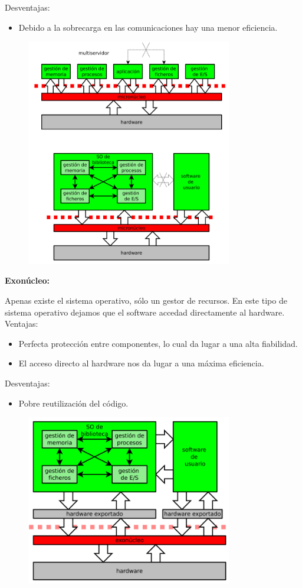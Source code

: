 \documentclass{article}
\begin{document}
Desventajas:
\begin{itemize}
\item Debido a la sobrecarga en las comunicaciones hay una menor eficiencia.
\end{itemize}

\begin{figure}[h]
\centering
\includegraphics[scale=1,width=90mm]{microkernel.png}
\end{figure}

\newpage

\textbf{Exonúcleo:}

Apenas existe el sistema operativo, sólo un gestor de recursos. En este tipo de sistema operativo dejamos que el software accedad directamente al hardware.\\

Ventajas:
\begin{itemize}
\item Perfecta protección entre componentes, lo cual da lugar a una alta fiabilidad.

\item El acceso directo al hardware nos da lugar a una máxima eficiencia.
\end{itemize}

Desventajas:
\begin{itemize}
\item Pobre reutilización del código.
\end{itemize}

\begin{figure}[h]
\centering
\includegraphics[scale=1, width=90mm]{exonucleo.png}
\end{figure}
\end{document}

